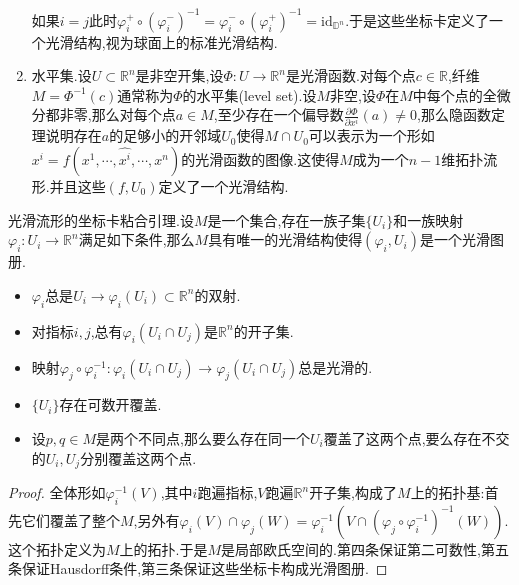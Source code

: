 \begin{enumerate}
	如果$i=j$此时$\varphi_i^+\circ(\varphi_i^-)^{-1}=\varphi_i^-\circ(\varphi_i^+)^{-1}=\mathrm{id}_{\mathbb{D}^n}$.于是这些坐标卡定义了一个光滑结构,视为球面上的标准光滑结构.
	\item 水平集.设$U\subset\mathbb{R}^n$是非空开集,设$\Phi:U\to\mathbb{R}^n$是光滑函数.对每个点$c\in\mathbb{R}$,纤维$M=\Phi^{-1}(c)$通常称为$\Phi$的水平集(level set).设$M$非空,设$\Phi$在$M$中每个点的全微分都非零,那么对每个点$a\in M$,至少存在一个偏导数$\frac{\partial\Phi}{\partial x^i}(a)\not=0$,那么隐函数定理说明存在$a$的足够小的开邻域$U_0$使得$M\cap U_0$可以表示为一个形如$x^i=f(x^1,\cdots,\hat{x^i},\cdots,x^n)$的光滑函数的图像.这使得$M$成为一个$n-1$维拓扑流形.并且这些$(f,U_0)$定义了一个光滑结构.
\end{enumerate}

光滑流形的坐标卡粘合引理.设$M$是一个集合,存在一族子集$\{U_i\}$和一族映射$\varphi_i:U_i\to\mathbb{R}^n$满足如下条件,那么$M$具有唯一的光滑结构使得$(\varphi_i,U_i)$是一个光滑图册.
\begin{itemize}
	\item $\varphi_i$总是$U_i\to\varphi_i(U_i)\subset\mathbb{R}^n$的双射.
	\item 对指标$i,j$,总有$\varphi_i(U_i\cap U_j)$是$\mathbb{R}^n$的开子集.
	\item 映射$\varphi_j\circ\varphi_i^{-1}:\varphi_i(U_i\cap U_j)\to\varphi_j(U_i\cap U_j)$总是光滑的.
	\item $\{U_i\}$存在可数开覆盖.
	\item 设$p,q\in M$是两个不同点,那么要么存在同一个$U_i$覆盖了这两个点,要么存在不交的$U_i,U_j$分别覆盖这两个点.
\end{itemize}
\begin{proof}
	
	全体形如$\varphi_i^{-1}(V)$,其中$i$跑遍指标,$V$跑遍$\mathbb{R}^n$开子集,构成了$M$上的拓扑基:首先它们覆盖了整个$M$,另外有$\varphi_i(V)\cap\varphi_j(W)=\varphi_i^{-1}\left(V\cap(\varphi_j\circ\varphi_i^{-1})^{-1}(W)\right)$.这个拓扑定义为$M$上的拓扑.于是$M$是局部欧氏空间的.第四条保证第二可数性,第五条保证Hausdorff条件,第三条保证这些坐标卡构成光滑图册.
\end{proof}

